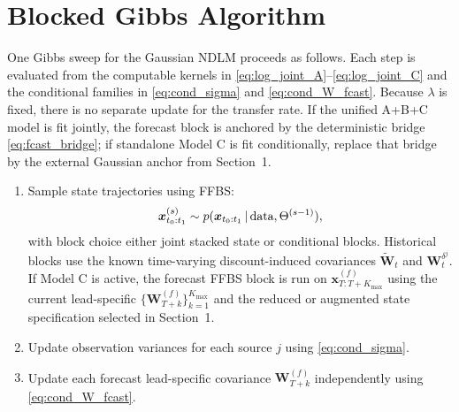 \section{Blocked Gibbs Algorithm}

One Gibbs sweep for the Gaussian NDLM proceeds as follows.
Each step is evaluated from the computable kernels in
\eqref{eq:log_joint_A}--\eqref{eq:log_joint_C} and the conditional families in
\eqref{eq:cond_sigma} and \eqref{eq:cond_W_fcast}.
Because $\lambda$ is fixed, there is no separate update for the transfer rate.
If the unified A+B+C model is fit jointly, the forecast block is anchored by the deterministic
bridge \eqref{eq:fcast_bridge}; if standalone Model C is fit conditionally, replace that bridge by
the external Gaussian anchor from Section~1.

\begin{enumerate}[label=\textbf{Step \arabic*:},leftmargin=2.8cm]
\item Sample state trajectories using FFBS:
\begin{align*}
\bm x_{t_0:t_1}^{(s)} \sim p(\bm x_{t_0:t_1}\,|\,\text{data},\Theta^{(s-1)}),
\end{align*}
with block choice either joint stacked state or conditional blocks.
Historical blocks use the known time-varying discount-induced covariances
$\tilde{\bm W}_t$ and $\bm W_t^{\delta^j}$.
If Model C is active, the forecast FFBS block is run on
$\bm x_{T:T+K_{\max}}^{(f)}$ using the current lead-specific
$\{\bm W_{T+k}^{(f)}\}_{k=1}^{K_{\max}}$ and the reduced or augmented state specification selected
in Section~1.

\item Update observation variances for each source $j$ using \eqref{eq:cond_sigma}.

\item Update each forecast lead-specific covariance
$\bm W_{T+k}^{(f)}$ independently using \eqref{eq:cond_W_fcast}.
\end{enumerate}


